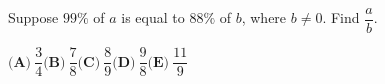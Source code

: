 Suppose $99\%$ of $a$ is equal to $88\%$ of $b$, where $b\ne0$. Find $\dfrac ab$.

$\textbf{(A)}\ \dfrac34$\qquad$\textbf{(B)}\ \dfrac78$\qquad$\textbf{(C)}\ \dfrac89$\qquad$\textbf{(D)}\ \dfrac98$\qquad$\textbf{(E)}\ \dfrac{11}{9}$
